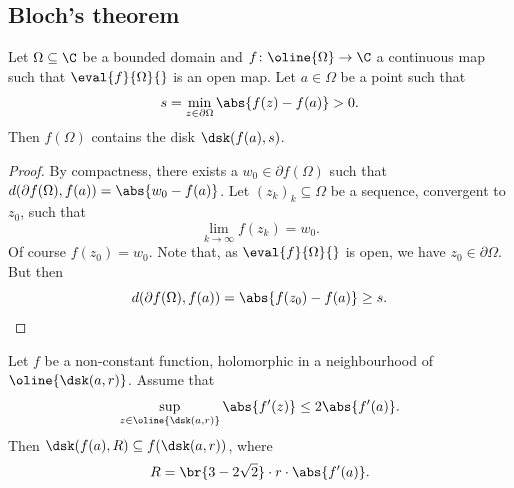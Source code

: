 \newpage

\subsection{Bloch's theorem}


\begin{lema}
Let $\Omega \subseteq \C$ be a bounded domain and
$f \colon \oline{\Omega} \to \C$ a continuous map such that
$\eval{f}{\Omega}{}$ is an open map. Let $a \in \Omega$ be a point
such that
\[
s = \min_{z \in \partial \Omega} \abs{f(z) - f(a)} > 0.
\]
Then $f(\Omega)$ contains the disk $\dsk(f(a), s)$.
\end{lema}

\begin{proof}
By compactness, there exists a $w_0 \in \partial f(\Omega)$ such
that $d(\partial f(\Omega), f(a)) = \abs{w_0 - f(a)}$. Let
$(z_k)_k \subseteq \Omega$ be a sequence, convergent to $z_0$, such
that
\[
\lim_{k \to \infty} f(z_k) = w_0.
\]
Of course $f(z_0) = w_0$. Note that, as $\eval{f}{\Omega}{}$ is
open, we have $z_0 \in \partial \Omega$. But then
\[
d(\partial f(\Omega), f(a)) = \abs{f(z_0) - f(a)} \geq s. \qedhere
\]
\end{proof}

\begin{lema}
\label{thm_hol:lm:bloch}
Let $f$ be a non-constant function, holomorphic in a neighbourhood
of $\oline{\dsk(a, r)}$. Assume that
\[
\sup_{z \in \oline{\dsk(a,r)}} \abs{f'(z)} \leq 2 \abs{f'(a)}.
\]
Then $\dsk(f(a), R) \subseteq f(\dsk(a, r))$, where
\[
R = \br{3 - 2 \sqrt{2}} \cdot r \cdot \abs{f'(a)}.
\]
\end{lema}

